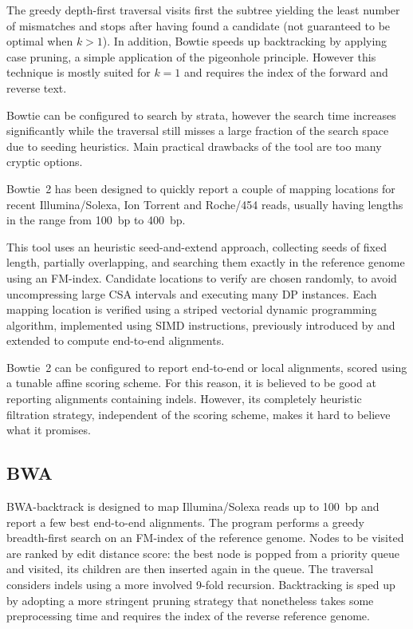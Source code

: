 The greedy depth-first traversal visits first the subtree yielding the least number of mismatches and stops after having found a candidate (not guaranteed to be optimal when $k>1$).
In addition, Bowtie speeds up backtracking by applying case pruning, a simple application of the pigeonhole principle.
However this technique is mostly suited for $k=1$ and requires the index of the forward and reverse text.

Bowtie can be configured to search by strata, however the search time increases significantly while the traversal still misses a large fraction of the search space due to seeding heuristics.
Main practical drawbacks of the tool are too many cryptic options.

Bowtie~2 \citep{Bowtie2} has been designed to quickly report a couple of mapping locations for recent Illumina/Solexa, Ion Torrent and Roche/454 reads, usually having lengths in the range from 100~bp to 400~bp.

This tool uses an heuristic seed-and-extend approach, collecting seeds of fixed length, partially overlapping, and searching them exactly in the reference genome using an FM-index.
Candidate locations to verify are chosen randomly, to avoid uncompressing large CSA intervals and executing many DP instances.
Each mapping location is verified using a striped vectorial dynamic programming algorithm, implemented using SIMD instructions, previously introduced by \citep{Farrar2007} and extended to compute end-to-end alignments.

Bowtie~2 can be configured to report end-to-end or local alignments, scored using a tunable affine scoring scheme.
For this reason, it is believed to be good at reporting alignments containing indels.
However, its completely heuristic filtration strategy, independent of the scoring scheme, makes it hard to believe what it promises.


\subsection{BWA}

BWA-backtrack \citep{BWA} is designed to map Illumina/Solexa reads up to 100~bp and report a few best end-to-end alignments.
The program performs a greedy breadth-first search on an FM-index of the reference genome.
Nodes to be visited are ranked by edit distance score: the best node is popped from a priority queue and visited, its children are then inserted again in the queue.
The traversal considers indels using a more involved 9-fold recursion.
Backtracking is sped up by adopting a more stringent pruning strategy that nonetheless takes some preprocessing time and requires the index of the reverse reference genome.

